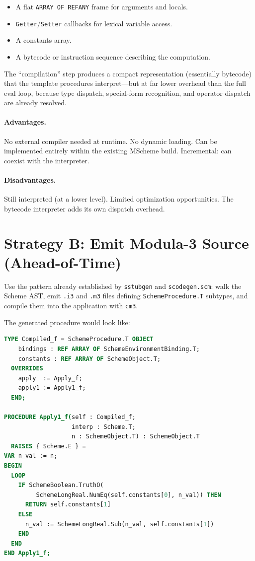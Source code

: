 \documentclass[12pt]{report}
\begin{document}
\begin{itemize}
\item A flat \texttt{ARRAY OF REFANY} frame for arguments and locals.
\item \texttt{Getter}/\texttt{Setter} callbacks for lexical variable
  access.
\item A constants array.
\item A bytecode or instruction sequence describing the computation.
\end{itemize}

The ``compilation'' step produces a compact representation (essentially
bytecode) that the template procedures interpret---but at far lower
overhead than the full eval loop, because type dispatch, special-form
recognition, and operator dispatch are already resolved.

\paragraph{Advantages.}
No external compiler needed at runtime.  No dynamic loading.
Can be implemented entirely within the existing MScheme build.
Incremental: can coexist with the interpreter.

\paragraph{Disadvantages.}
Still interpreted (at a lower level).  Limited optimization
opportunities.  The bytecode interpreter adds its own dispatch
overhead.

\section{Strategy B: Emit Modula-3 Source (Ahead-of-Time)}
\label{sec:stratB}

Use the pattern already established by \texttt{sstubgen} and
\texttt{scodegen.scm}: walk the Scheme AST, emit \texttt{.i3}
and \texttt{.m3} files defining \texttt{SchemeProcedure.T}
subtypes, and compile them into the application with \texttt{cm3}.

The generated procedure would look like:

\begin{lstlisting}[language=Modula3]
TYPE Compiled_f = SchemeProcedure.T OBJECT
    bindings : REF ARRAY OF SchemeEnvironmentBinding.T;
    constants : REF ARRAY OF SchemeObject.T;
  OVERRIDES
    apply  := Apply_f;
    apply1 := Apply1_f;
  END;

PROCEDURE Apply1_f(self : Compiled_f;
                   interp : Scheme.T;
                   n : SchemeObject.T) : SchemeObject.T
  RAISES { Scheme.E } =
VAR n_val := n;
BEGIN
  LOOP
    IF SchemeBoolean.TruthO(
         SchemeLongReal.NumEq(self.constants[0], n_val)) THEN
      RETURN self.constants[1]
    ELSE
      n_val := SchemeLongReal.Sub(n_val, self.constants[1])
    END
  END
END Apply1_f;
\end{lstlisting}
\end{document}
